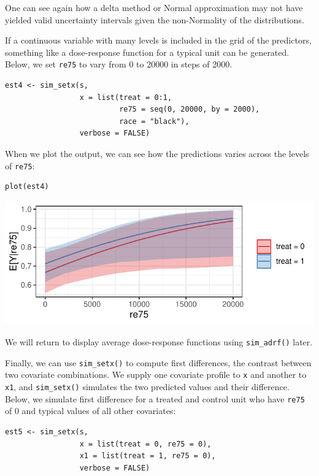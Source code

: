 One can see again how a delta method or Normal approximation may not have yielded valid uncertainty intervals given the non-Normality of the distributions.

If a continuous variable with many levels is included in the grid of the predictors, something like a dose-response function for a typical unit can be generated. Below, we set \texttt{re75} to vary from 0 to 20000 in steps of 2000.

\begin{verbatim}
est4 <- sim_setx(s,
                 x = list(treat = 0:1,
                          re75 = seq(0, 20000, by = 2000),
                          race = "black"),
                 verbose = FALSE)
\end{verbatim}

When we plot the output, we can see how the predictions varies across the levels of \texttt{re75}:

\begin{verbatim}
plot(est4)
\end{verbatim}

\begin{center}\includegraphics{figures/unnamed-chunk-16-1} \end{center}

We will return to display average dose-response functions using \texttt{sim\_adrf()} later.

Finally, we can use \texttt{sim\_setx()} to compute first differences, the contrast between two covariate combinations. We supply one covariate profile to \texttt{x} and another to \texttt{x1}, and \texttt{sim\_setx()} simulates the two predicted values and their difference. Below, we simulate first difference for a treated and control unit who have \texttt{re75} of 0 and typical values of all other covariates:

\begin{verbatim}
est5 <- sim_setx(s,
                 x = list(treat = 0, re75 = 0),
                 x1 = list(treat = 1, re75 = 0),
                 verbose = FALSE)
\end{verbatim}

